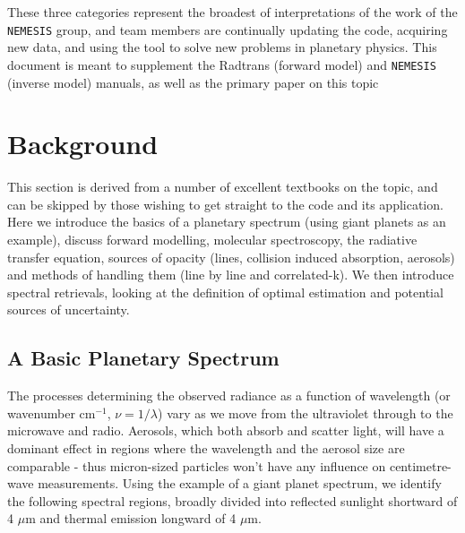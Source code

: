 \documentclass[final,5p,times,twocolumn,authoryear]{elsarticle}
\begin{document}
These three categories represent the broadest of interpretations of the work of the \verb#NEMESIS# group, and team members are continually updating the code, acquiring new data, and using the tool to solve new problems in planetary physics.  This document is meant to supplement the Radtrans (forward model) and \verb#NEMESIS# (inverse model) manuals, as well as the primary paper on this topic \citep{08irwin}

\section{Background}

This section is derived from a number of excellent textbooks on the topic, and can be skipped by those wishing to get straight to the code and its application.  Here we introduce the basics of a planetary spectrum (using giant planets as an example), discuss forward modelling, molecular spectroscopy, the radiative transfer equation, sources of opacity (lines, collision induced absorption, aerosols) and methods of handling them (line by line and correlated-k).  We then introduce spectral retrievals, looking at the definition of optimal estimation and potential sources of uncertainty.

\subsection{A Basic Planetary Spectrum}

The processes determining the observed radiance as a function of wavelength (or wavenumber cm$^{-1}$, $\nu=1/\lambda$) vary as we move from the ultraviolet through to the microwave and radio.  Aerosols, which both absorb and scatter light, will have a dominant effect in regions where the wavelength and the aerosol size are comparable - thus micron-sized particles won't have any influence on centimetre-wave measurements.  Using the example of a giant planet spectrum, we identify the following spectral regions, broadly divided into reflected sunlight shortward of 4 $\mu$m and thermal emission longward of 4 $\mu$m.
\end{document}
